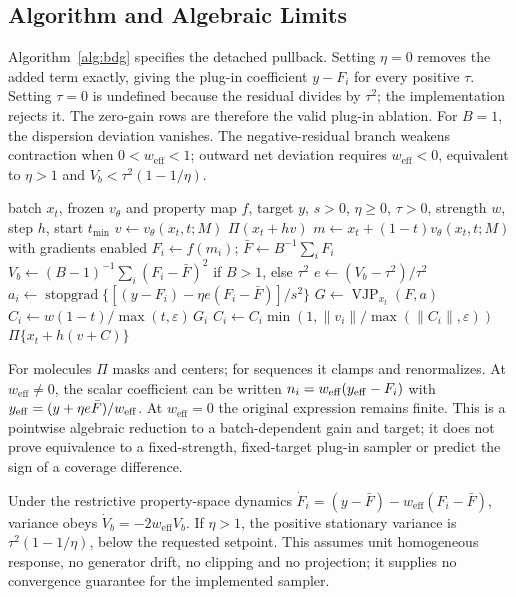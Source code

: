 \documentclass{article}
\newcommand{\Fbar}{\bar F}
\newcommand{\weff}{w_{\mathrm{eff}}}
\newcommand{\sg}{\operatorname{stopgrad}}
\begin{document}
\subsection{Algorithm and Algebraic Limits}\label{app:algebra}
Algorithm~\ref{alg:bdg} specifies the detached pullback. Setting $\eta=0$ removes the added term exactly, giving the plug-in coefficient $y-F_i$ for every positive $\tau$. Setting $\tau=0$ is undefined because the residual divides by $\tau^2$; the implementation rejects it. The zero-gain rows are therefore the valid plug-in ablation. For $B=1$, the dispersion deviation vanishes. The negative-residual branch weakens contraction when $0<\weff<1$; outward net deviation requires $\weff<0$, equivalent to $\eta>1$ and $V_b<\tau^2(1-1/\eta)$.
\begin{algorithm}[H]
\caption{One BDG-guided Euler step}\label{alg:bdg}
\begin{algorithmic}[1]
\Require batch $x_t$, frozen $v_\theta$ and property map $f$, target $y$, $s>0$, $\eta\ge0$, $\tau>0$, strength $w$, step $h$, start $t_{\min}$
\State $v\gets v_\theta(x_t,t;M)$
 \State \Return $\Pi(x_t+hv)$ \EndIf
\State $m\gets x_t+(1-t)v_\theta(x_t,t;M)$ with gradients enabled
\State $F_i\gets f(m_i)$; $\Fbar\gets B^{-1}\sum_iF_i$
\State $V_b\gets(B-1)^{-1}\sum_i(F_i-\Fbar)^2$ if $B>1$, else $\tau^2$
\State $e\gets(V_b-\tau^2)/\tau^2$
\State $a_i\gets\sg\{[(y-F_i)-\eta e(F_i-\Fbar)]/s^2\}$
\State $G\gets\operatorname{VJP}_{x_t}(F,a)$
\State $C_i\gets w(1-t)/\max(t,\varepsilon)\,G_i$
\State $C_i\gets C_i\min(1,\|v_i\|/\max(\|C_i\|,\varepsilon))$
\State \Return $\Pi\{x_t+h(v+C)\}$
\end{algorithmic}
\end{algorithm}
For molecules $\Pi$ masks and centers; for sequences it clamps and renormalizes. At $\weff\ne0$, the scalar coefficient can be written $n_i=\weff(y_{\rm eff}-F_i)$ with $y_{\rm eff}=(y+\eta e\Fbar)/\weff$. At $\weff=0$ the original expression remains finite. This is a pointwise algebraic reduction to a batch-dependent gain and target; it does not prove equivalence to a fixed-strength, fixed-target plug-in sampler or predict the sign of a coverage difference.

Under the restrictive property-space dynamics $\dot F_i=(y-\Fbar)-\weff(F_i-\Fbar)$, variance obeys $\dot V_b=-2\weff V_b$. If $\eta>1$, the positive stationary variance is $\tau^2(1-1/\eta)$, below the requested setpoint. This assumes unit homogeneous response, no generator drift, no clipping and no projection; it supplies no convergence guarantee for the implemented sampler.
\end{document}
